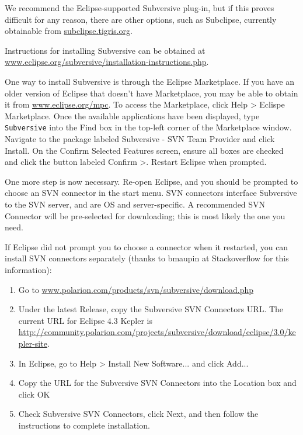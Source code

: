 \documentclass{article}
\begin{document}
We recommend the Eclipse-supported Subversive plug-in, but if this
proves difficult for any reason, there are other options, such as
Subclipse, currently obtainable from
\href{http://subclipse.tigris.org/servlets/ProjectProcess?pageID=p4wYuA}
{subclipse.tigris.org}.

Instructions for installing Subversive can be obtained at
\href{http://www.eclipse.org/subversive/installation-instructions.php}
{www.eclipse.org/subversive/installation-instructions.php}.

One way to install Subversive is through the Eclipse Marketplace.  If
you have an older version of Eclipse that doesn't have Marketplace,
you may be able to obtain it from
\href{http://www.eclipse.org/mpc/}{www.eclipse.org/mpc}.  To access
the Marketplace, click {\sf Help > Eclispe Marketplace}. Once the
available applications have been displayed, type {\tt Subversive} into
the {\sf Find} box in the top-left corner of the Marketplace
window. Navigate to the package labeled {\sf Subversive - SVN Team
Provider} and click {\sf Install}. On the {\sf Confirm Selected
Features} screen, ensure all boxes are checked and click the button
labeled {\sf Confirm >}. Restart Eclipse when prompted.

One more step is now necessary. Re-open Eclipse, and you should be
prompted to choose an SVN connector in the start menu.  SVN connectors
interface Subversive to the SVN server, and are OS and
server-specific. A recommended SVN Connector will be pre-selected for
downloading; this is most likely the one you need.

If Eclipse did not prompt you to choose a connector when it restarted,
you can install SVN connectors separately (thanks to bmaupin at
Stackoverflow for this information):

\begin{enumerate}

\item  Go to 
\href{http://www.polarion.com/products/svn/subversive/download.php}
{www.polarion.com/products/svn/subversive/download.php}

\item Under the latest {\sf Release}, copy the Subversive SVN
Connectors URL. The current URL for Eclipse 4.3 Kepler
is \href{http://community.polarion.com/projects/subversive/download/eclipse/3.0/kepler-site/}
{http://community.polarion.com/projects/subversive/download/eclipse/3.0/kepler-site}.

\item In Eclipse, go to {\sf Help > Install New Software...} and 
click {\sf Add...}  

\item Copy the URL for the Subversive SVN Connectors into the {\sf
Location} box and click {\sf OK}

\item Check {\sf Subversive SVN Connectors}, click {\sf Next}, and
then follow the instructions to complete installation.

\end{enumerate}
\end{document}
